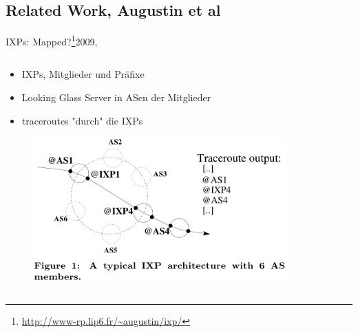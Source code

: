 \documentclass[ngerman,compress,hyperref={bookmarks}]{beamer}
\begin{document}
\subsection{Related Work, Augustin et al}
\begin{frame}{IXPs: Mapped?\footnote{\url{http://www-rp.lip6.fr/~augustin/ixp/}}}{2009, \cite{Augustin:2009:IM:1644893.1644934}}
  \begin{columns}[c]
    \begin{column}{0.55\textwidth}
      \begin{itemize}
        \item IXPs, Mitglieder und Präfixe
        \item Looking Glass Server in ASen der Mitglieder
        \item traceroutes "durch" die IXPs
      \end{itemize}
      \begin{figure}
        \label{augustin_ixp}
        \includegraphics[width=1\textwidth]{images/augustin_ixp}
      \end{figure}
    \end{column}
    \begin{column}{0.1\textwidth}
      \begin{figure}
        \label{augustin}

\end{figure}
\end{column}
\end{columns}
\end{frame}
\end{document}
